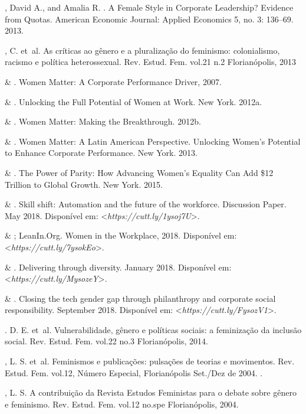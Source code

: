 \begin{Parskip}
, David A., and Amalia R. . A Female Style in Corporate
Leadership? Evidence from Quotas. American Economic Journal: Applied
Economics 5, no. 3: 136--69. 2013.

, C. et~al. As críticas ao gênero e a pluralização do feminismo:
colonialismo, racismo e política heterossexual. Rev. Estud. Fem. vol.21
n.2 Florianópolis, 2013

 \& . Women Matter: A Corporate Performance Driver, 2007.

 \& . Unlocking the Full Potential of Women at Work. New
York. 2012a.

 \& . Women Matter: Making the Breakthrough. 2012b.

 \& . Women Matter: A Latin American Perspective.
Unlocking Women's Potential to Enhance Corporate Performance. New York.
2013.

 \& . The Power of Parity: How Advancing Women's Equality
Can Add \$12 Trillion to Global Growth. New York. 2015.

 \& . Skill shift: Automation and the future of the
workforce. Discussion Paper. May 2018.
Disponível em: \textless{}\emph{https://cutt.ly/1ysoj7U}\textgreater{}.

 \& ; LeanIn.Org. Women in the Workplace, 2018.
Disponível em: \textless{}\emph{https://cutt.ly/7ysokEo}\textgreater{}.

 \& . Delivering through diversity. January 2018.
Disponível em: \textless{}\emph{https://cutt.ly/MysozeY}\textgreater{}.

 \& . Closing the tech gender gap through philanthropy
and corporate social responsibility. September 2018.
Disponível em: \textless{}\emph{https://cutt.ly/FysozV1}\textgreater{}.

. D. E. et~al. Vulnerabilidade, gênero e políticas sociais: a
feminização da inclusão social. Rev. Estud. Fem. vol.22 no.3
Florianópolis, 2014.

, L. S. et~al. Feminismos e publicações: pulsações de teorias e
movimentos. Rev. Estud. Fem. vol.12, Número Especial, Florianópolis
Set./Dez de 2004. .

, L. S. A contribuição da Revista Estudos Feministas para o
debate sobre gênero e feminismo. Rev. Estud. Fem. vol.12 no.spe
Florianópolis, 2004.


\end{Parskip}
